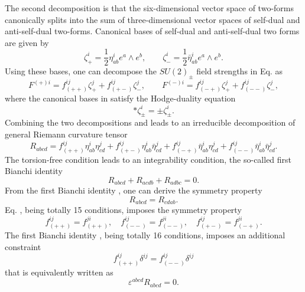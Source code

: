 \documentclass[12pt,epsf]{article}
\begin{document}
The second decomposition  is that the six-dimensional vector space of two-forms canonically splits into the sum
of three-dimensional vector spaces of self-dual and anti-self-dual two-forms.
Canonical bases of self-dual and anti-self-dual two forms are given by
\begin{equation}\label{2sd-asd}
  \zeta^i_+ = \frac{1}{2} \eta^i_{ab} e^a \wedge e^b, \qquad \zeta^i_- = \frac{1}{2} \bar{\eta}^i_{ab} e^a \wedge e^b.
\end{equation}
Using these bases, one can decompose the $SU(2)_\pm$ field strengths in Eq.  as
\begin{equation} \label{dec-fs}
  F^{(+)i} = f^{ij}_{(++)} \zeta^j_+ +  f^{ij}_{(+-)} \zeta^j_-, \qquad
  F^{(-)i} =  f^{ij}_{(-+)} \zeta^j_+ +  f^{ij}_{(--)} \zeta^j_-,
\end{equation}
where the canonical bases in  satisfy the Hodge-duality equation
\begin{equation} \label{2-hodge}
  * \zeta^i_\pm  = \pm \zeta^i_\pm.
\end{equation}
Combining the two decompositions  and  leads to an irreducible decomposition
of general Riemann curvature tensor \cite{s-duality,book-besse,oh-yang,joy-jhep}
\begin{equation}\label{decom-riem}
  R_{abcd} = f^{ij}_{(++)}\eta^i_{ab}\eta^j_{cd} + f^{ij}_{(+-)}\eta^i_{ab} \bar{\eta}^j_{cd}
  +  f^{ij}_{(-+)} \bar{\eta}^i_{ab} \eta^j_{cd} + f^{ij}_{(--)} \bar{\eta}^i_{ab}\bar{\eta}^j_{cd}.
\end{equation}
The torsion-free condition  leads to an integrability condition, the so-called first Bianchi identity
\begin{equation}\label{1-bianchi}
 R_{abcd}+ R_{acdb} + R_{adbc} = 0.
\end{equation}
From the first Bianchi identity , one can derive the symmetry property
\begin{equation}\label{symm-riem}
 R_{abcd} = R_{cdab}.
\end{equation}
Eq. , being totally 15 conditions, imposes the symmetry property
\begin{equation}\label{symm-fij}
f^{ij}_{(++)} = f^{ji}_{(++)}, \quad f^{ij}_{(--)}=f^{ji}_{(--)},
\quad  f^{ij}_{(+-)} = f^{ji}_{(-+)}.
\end{equation}
The first Bianchi identity , being totally 16 conditions, imposes an additional constraint
\begin{equation}\label{1-more}
  f^{ij}_{(++)} \delta^{ij} = f^{ij}_{(--)} \delta^{ij}
\end{equation}
that is equivalently written as
\begin{equation}\label{pseudo-r}
  \varepsilon^{abcd} R_{abcd} = 0.
\end{equation}
\end{document}
